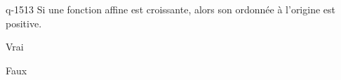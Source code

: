 \begin{truefalse}{q-1513}
Si une fonction affine est croissante, alors son ordonnée à l'origine est positive.
\item Vrai
\item* Faux
\end{truefalse}

